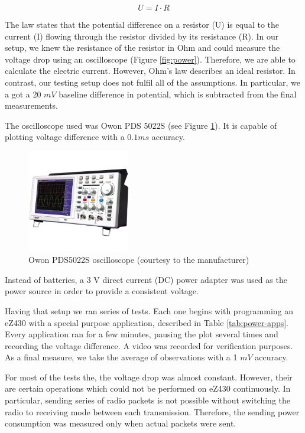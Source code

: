 $$
U = I \cdot R
$$

The law states that the potential difference on a resistor (U) is equal to the current (I) flowing through the resistor divided by its resistance (R).
In our setup, we knew the resistance of the resistor in Ohm and could measure the voltage drop using an oscilloscope (Figure \ref{fig:power}).
Therefore, we are able to calculate the electric current.
However, Ohm's law describes an ideal resistor.
In contrast, our testing setup does not fulfil all of the assumptions.
In particular, we a got a 20 $mV$ baseline difference in potential, which is subtracted from the final measurements.

The oscilloscope used was Owon PDS 5022S (see Figure \ref{fig:owon}).
It is capable of plotting voltage difference with a $ 0.1 ms$ accuracy.

\begin{figure}[h]
  \centering
  \includegraphics[width=0.4\textwidth]{img/owon_pds5022s.jpg}
  \caption{Owon PDS5022S oscilloscope (courtesy to the manufacturer)}
  \label{fig:owon}
\end{figure}

Instead of batteries, a 3 V direct current (DC) power adapter was used as the power source in order to provide a consistent voltage.

Having that setup we ran series of tests.
Each one begins with programming an eZ430 with a special purpose application, described in Table \ref{tab:power-apps}.
Every application ran for a few minutes, pausing the plot several times and recording the voltage difference.
A video was recorded for verification purposes.
As a final measure, we take the average of observations with a 1 $ mV $ accuracy.

For most of the tests the, the voltage drop was almost constant.
However, their are certain operations which could not be performed on eZ430 continuously.
In particular, sending series of radio packets is not possible without switching the radio to receiving mode between each transmission.
Therefore, the sending power consumption was measured only when actual packets were sent.

